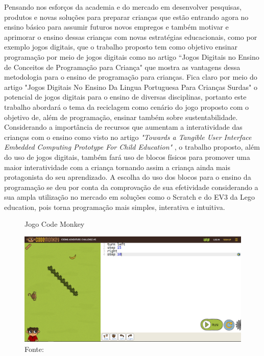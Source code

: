 Pensando nos esforços da academia e do mercado em desenvolver pesquisas, produtos e novas soluções para preparar crianças que estão entrando agora no ensino básico para assumir futuros novos empregos e também motivar e aprimorar o ensino dessas crianças com novas estratégias educacionais, como  por exemplo jogos digitais, que o trabalho proposto tem como objetivo ensinar programação por meio de jogos digitais como no artigo “Jogos Digitais no Ensino de Conceitos de Programação para Criança" \cite{tadesco_2016} que mostra as vantagens dessa metodologia para o ensino de programação para crianças. Fica claro por meio do artigo "Jogos Digitais No Ensino Da Lingua Portuguesa Para Crianças Surdas" \cite{liz_2017} o potencial de jogos digitais para o ensino de diversas disciplinas, portanto este trabalho abordará o tema da reciclagem como cenário do jogo proposto com o objetivo de, além de programação, ensinar também sobre sustentabilidade. Considerando a importância de recursos que aumentam a interatividade das crianças com o ensino como visto no artigo \textit{"Towards a Tangible User Interface Embedded Computing Prototype For Child Education"} \cite{carneiro_2018}, o trabalho proposto, além do uso de jogos digitais, também fará uso de blocos físicos para promover uma maior interatividade com a criança tornando assim a criança ainda mais protagonista do seu aprendizado. A escolha do uso dos blocos para o ensino da programação se deu por conta da comprovação de sua efetividade considerando a sua ampla utilização no mercado em soluções como o Scratch e do EV3 da Lego education, pois torna programação mais simples, interativa e intuitiva. 

\captionsetup{justification=centering}

\begin{figure}[h!]
    \centering
    \caption{Jogo Code Monkey}
    \includegraphics[width=15cm]{images/cap2/code_monkey.png}
    \caption*{Fonte:}
    \label{figura:code_monkey}
\end{figure}


